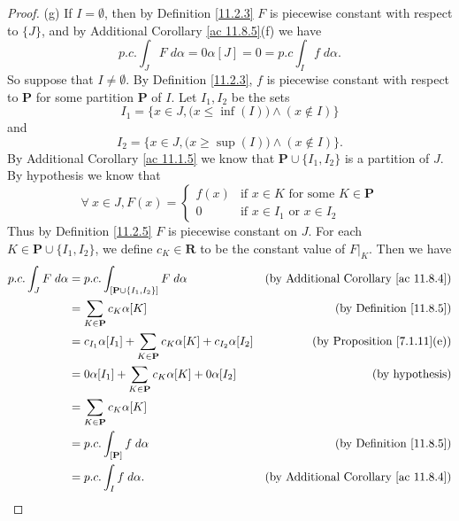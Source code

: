 \begin{proof}{(g)}
    If \(I = \emptyset\), then by Definition \ref{11.2.3} \(F\) is piecewise constant with respect to \(\{J\}\), and by Additional Corollary \ref{ac 11.8.5}(f) we have
    \[
        p.c. \int_J F \; d \alpha = 0 \alpha[J] = 0 = p.c \int_I f \; d \alpha.
    \]
    So suppose that \(I \neq \emptyset\).
    By Definition \ref{11.2.3}, \(f\) is piecewise constant with respect to \(\mathbf{P}\) for some partition \(\mathbf{P}\) of \(I\).
    Let \(I_1, I_2\) be the sets
    \[
        I_1 = \Big\{x \in J, \big(x \leq \inf(I)\big) \land (x \notin I)\Big\}
    \]
    and
    \[
        I_2 = \Big\{x \in J, \big(x \geq \sup(I)\big) \land (x \notin I)\Big\}.
    \]
    By Additional Corollary \ref{ac 11.1.5} we know that \(\mathbf{P} \cup \{I_1, I_2\}\) is a partition of \(J\).
    By hypothesis we know that
    \[
        \forall\ x \in J, F(x) = \begin{cases}
            f(x) & \text{if } x \in K \text{ for some } K \in \mathbf{P} \\
            0    & \text{if } x \in I_1 \text{ or } x \in I_2
        \end{cases}
    \]
    Thus by Definition \ref{11.2.5} \(F\) is piecewise constant on \(J\).
    For each \(K \in \mathbf{P} \cup \{I_1, I_2\}\), we define \(c_K \in \mathbf{R}\) to be the constant value of \(F|_K\).
    Then we have
    \begin{align*}
        p.c. \int_J F \; d \alpha & = p.c. \int_{[\mathbf{P} \cup \{I_1, I_2\}]} F \; d \alpha                          & \text{(by Additional Corollary \ref{ac 11.8.4})} \\
                                  & = \sum_{K \in \mathbf{P}} c_K \alpha[K]                                             & \text{(by Definition \ref{11.8.5})}              \\
                                  & = c_{I_1} \alpha[I_1] + \sum_{K \in \mathbf{P}} c_K \alpha[K] + c_{I_2} \alpha[I_2] & \text{(by Proposition \ref{7.1.11}(e))}          \\
                                  & = 0 \alpha[I_1] + \sum_{K \in \mathbf{P}} c_K \alpha[K] + 0 \alpha[I_2]             & \text{(by hypothesis)}                           \\
                                  & = \sum_{K \in \mathbf{P}} c_K \alpha[K]                                                                                                \\
                                  & = p.c. \int_{[\mathbf{P}]} f \; d \alpha                                            & \text{(by Definition \ref{11.8.5})}              \\
                                  & = p.c. \int_I f \; d \alpha.                                                        & \text{(by Additional Corollary \ref{ac 11.8.4})}
    \end{align*}
\end{proof}

